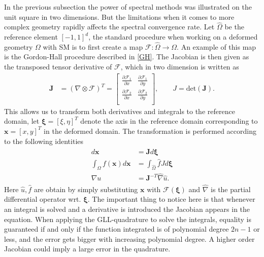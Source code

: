 In the previous subsection the power of spectral methods was illustrated on the unit square in two dimensions.
But the limitations when it comes to more complex geometry rapidly affects the spectral convergence rate. 
Let $\hat{\Omega}$ be the reference element $[-1,1]^d$,
the standard procedure when working on a deformed geometry $\Omega$ with SM is to first create a map 
$\mathcal{F}:\hat{\Omega}\rightarrow\Omega$. An example of this map is the Gordon-Hall procedure 
described in \cref{GH}.
The Jacobian is then given as the transposed tensor derivative of $\mathcal{F}$, which in two dimension is 
written as 
\begin{align}
    \mathbf{J} &= (\nabla \otimes \mathcal{F})^T =
\begin{bmatrix}
    \frac{\partial \mathcal{F}_1}{\partial x} &  \frac{\partial \mathcal{F}_1}{\partial y}  \\ 	
	\frac{\partial \mathcal{F}_2}{\partial x} &  \frac{\partial \mathcal{F}_2}{\partial y} \\ 	
\end{bmatrix},\qquad
J = \text{det}(\mathbf{J}).
    \label{eq:jaobian}
\end{align}
This allows us to transform both derivatives and integrals to the reference domain, let $\boldsymbol\xi = [\xi,\eta]^T$ denote the axis in the reference 
domain corresponding to $\mathbf{x} = [x,y]^T$ in the deformed domain. The transformation is performed according to the following identities
\begin{align}
    \begin{split}
        d\mathbf{x} &= \mathbf{J}d\boldsymbol\xi \\
        \int_{\Omega}f(\mathbf{x})d\mathbf{x} &= \int_{\hat\Omega}\hat f J d\boldsymbol\xi \\
        \nabla u &= \mathbf{J}^{-T}\hat\nabla \hat u.
    \end{split}
    \label{eq:transforms}
\end{align}
Here $\hat u,\hat f$ are obtain by simply substituting $\mathbf{x}$ with $\mathcal{F}(\boldsymbol{\xi})$ and $\hat \nabla $ is the partial 
differential operator wrt. $\boldsymbol\xi$. The important thing to notice here is that whenever an integral is solved and a derivative is 
introduced the Jacobian appears in the equation. When applying the GLL-quadrature to solve the integrals, equality is guaranteed if and 
only if the function integrated is of polynomial degree $2n-1$ or less, 
and the error gets bigger with increasing polynomial degree. A higher order Jacobian could imply a large error in the quadrature.

